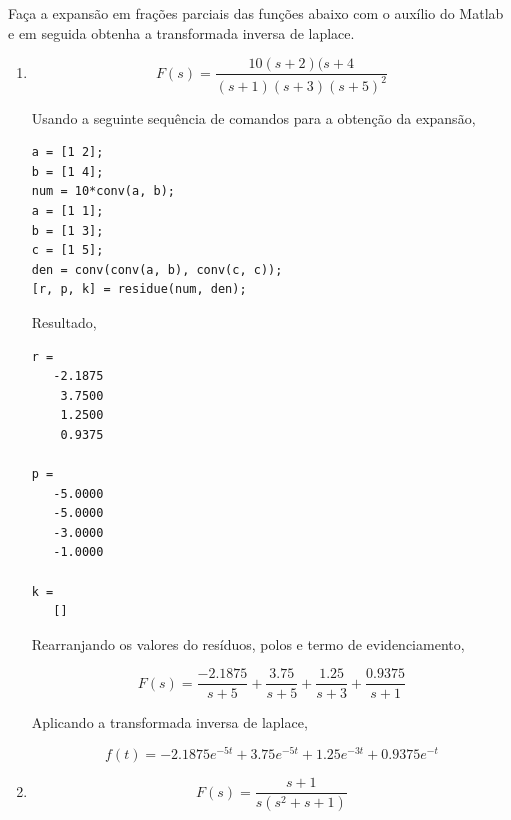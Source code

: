\documentclass[paper=a4, fontsize=11pt]{article}
\begin{document}


\begin{list}{\textbf{Questão .}}{
\setlength{\labelwidth}{-2mm} \setlength{\parsep}{0mm}
\setlength{\topsep}{0mm} \setlength{\leftmargin}{0mm}}
\renewcommand{\labelenumi}{(\alph{enumi})}

\item Faça a expansão em frações parciais das funções abaixo com o auxílio do Matlab
e em seguida obtenha a transformada inversa de laplace.
    \begin{enumerate}
        \item       
            $$ 
                F(s) = \frac{10(s+2)(s+4}{(s+1)(s+3)(s+5)^2}
            $$

Usando a seguinte sequência de comandos para a obtenção da expansão,
            \begin{lstlisting}
a = [1 2];
b = [1 4];
num = 10*conv(a, b);
a = [1 1];
b = [1 3];
c = [1 5];
den = conv(conv(a, b), conv(c, c));
[r, p, k] = residue(num, den);
\end{lstlisting}
        Resultado,

        \begin{lstlisting}
r = 
   -2.1875 
    3.7500
    1.2500
    0.9375

p = 
   -5.0000
   -5.0000
   -3.0000
   -1.0000

k = 
   []
        \end{lstlisting}
        Rearranjando os valores do resíduos, polos e termo de evidenciamento,

            $$
                F(s) = \frac{-2.1875}{s+5} + \frac{3.75}{s+5} + \frac{1.25}{s+3} + \frac{0.9375}{s+1}
            $$

            Aplicando a transformada inversa de laplace,

            $$
            f(t) = -2.1875 e^{-5t} + 3.75 e^{-5t} + 1.25 e^{-3t} + 0.9375 e^{-t}
            $$
         


    \item

        $$
        F(s) = \frac{s+1}{s(s^2+s+1)}
        $$


\end{enumerate}
\end{list}
\end{document}
